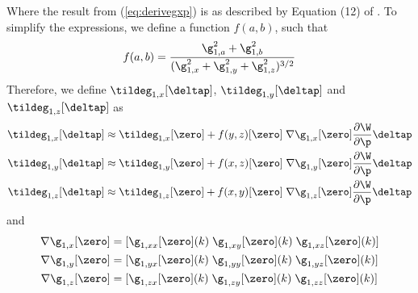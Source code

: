 Where the result from (\ref{eq:derivegxp}) is as described by Equation (12) of \cite{RefWorks:6}. To simplify the expressions, we define a function $f(a,b)$, such that
\begin{equation}\label{eq:f-simplify}
    f(a,b) = \frac{\g_{1,a}^2 + \g_{1,b}^2}{(\g_{1,x}^2 + \g_{1,y}^2 + \g_{1,z}^2)^{3/2}}
\end{equation}
Therefore, we define $\tildeg_{1,x}[\deltap]$, $\tildeg_{1,y}[\deltap]$ and $\tildeg_{1,z}[\deltap]$ as
\begin{equation}
  \begin{aligned}\label{eq:eucgyz}
    \tildeg_{1,x}[\deltap] &\approx \tildeg_{1,x}[\zero] + f(y,z)[\zero] \; \nabla \g_{1,x}[\zero] \frac{\partial \W}{\partial \p} \deltap \\  
    \tildeg_{1,y}[\deltap] &\approx \tildeg_{1,y}[\zero] + f(x,z)[\zero] \; \nabla \g_{1,y}[\zero] \frac{\partial \W}{\partial \p} \deltap \\
    \tildeg_{1,z}[\deltap] &\approx \tildeg_{1,z}[\zero] + f(x,y)[\zero] \; \nabla \g_{1,z}[\zero] \frac{\partial \W}{\partial \p} \deltap
  \end{aligned}
\end{equation}
 and
\begin{equation}
  \begin{aligned}\label{eq:euc-second-order-derivs}
    \nabla \g_{1,x}[\zero] &= [ \g_{1,xx}[\zero](k) \; \g_{1,xy}[\zero](k) \; \g_{1,xz}[\zero](k) ] \\
    \nabla \g_{1,y}[\zero] &= [ \g_{1,yx}[\zero](k) \; \g_{1,yy}[\zero](k) \; \g_{1,yz}[\zero](k) ] \\
    \nabla \g_{1,z}[\zero] &= [ \g_{1,zx}[\zero](k) \; \g_{1,zy}[\zero](k) \; \g_{1,zz}[\zero](k) ]
  \end{aligned}
\end{equation}

